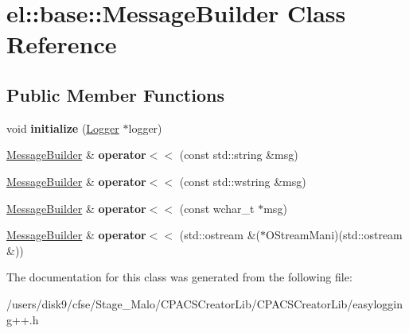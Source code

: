 \hypertarget{classel_1_1base_1_1MessageBuilder}{\section{el\-:\-:base\-:\-:Message\-Builder Class Reference}
\label{classel_1_1base_1_1MessageBuilder}
}
\subsection*{Public Member Functions}
\begin{DoxyCompactItemize}
\item 
\hypertarget{classel_1_1base_1_1MessageBuilder_a61729d9b620eb7b3e6ac1af69364553c}{void {\bfseries initialize} (\hyperlink{classel_1_1Logger}{Logger} $\ast$logger)}\label{classel_1_1base_1_1MessageBuilder_a61729d9b620eb7b3e6ac1af69364553c}

\item 
\hypertarget{classel_1_1base_1_1MessageBuilder_a740a968d7f2901d49a2e1c348cfea7bf}{\hyperlink{classel_1_1base_1_1MessageBuilder}{Message\-Builder} \& {\bfseries operator$<$$<$} (const std\-::string \&msg)}\label{classel_1_1base_1_1MessageBuilder_a740a968d7f2901d49a2e1c348cfea7bf}

\item 
\hypertarget{classel_1_1base_1_1MessageBuilder_ad04c5d0a8fc38662ede9aaa742912a42}{\hyperlink{classel_1_1base_1_1MessageBuilder}{Message\-Builder} \& {\bfseries operator$<$$<$} (const std\-::wstring \&msg)}\label{classel_1_1base_1_1MessageBuilder_ad04c5d0a8fc38662ede9aaa742912a42}

\item 
\hypertarget{classel_1_1base_1_1MessageBuilder_a42c2a21a6bebb2ad52d22da054cd8f49}{\hyperlink{classel_1_1base_1_1MessageBuilder}{Message\-Builder} \& {\bfseries operator$<$$<$} (const wchar\-\_\-t $\ast$msg)}\label{classel_1_1base_1_1MessageBuilder_a42c2a21a6bebb2ad52d22da054cd8f49}

\item 
\hypertarget{classel_1_1base_1_1MessageBuilder_a884b9fd5f742f5fa25bbc78d3415a674}{\hyperlink{classel_1_1base_1_1MessageBuilder}{Message\-Builder} \& {\bfseries operator$<$$<$} (std\-::ostream \&($\ast$O\-Stream\-Mani)(std\-::ostream \&))}\label{classel_1_1base_1_1MessageBuilder_a884b9fd5f742f5fa25bbc78d3415a674}

\end{DoxyCompactItemize}


The documentation for this class was generated from the following file\-:\begin{DoxyCompactItemize}
\item 
/users/disk9/cfse/\-Stage\-\_\-\-Malo/\-C\-P\-A\-C\-S\-Creator\-Lib/\-C\-P\-A\-C\-S\-Creator\-Lib/easylogging++.\-h\end{DoxyCompactItemize}
